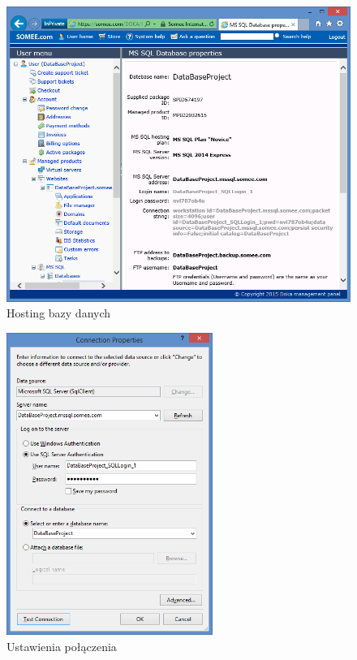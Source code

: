 \documentclass[a4paper,11pt]{article}
\begin{document}
\begin{figure}[H]
	\centering
	\includegraphics[width=\textwidth,height=0.6\textheight]{db1.png}
	\caption{Hosting bazy danych}
\end{figure}
\begin{figure}[H]
	\centering
	\includegraphics[width=0.6\textwidth,height=0.42\textheight]{db3.png}
	\caption{Ustawienia połączenia}
\end{figure}
\end{document}
